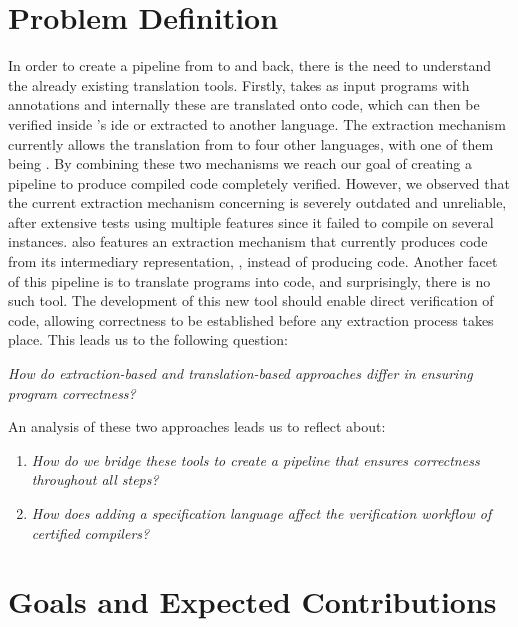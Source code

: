 \section{Problem Definition}
\label{sec:Problem_Definition}

In order to create a pipeline from \ocaml to \cml and back, there is the need to understand the already existing translation tools.
Firstly, \cameleer takes as input \ocaml programs with \gospel annotations and internally these are translated onto \whyml code, which
can then be verified inside \whythree's ide or extracted to another language. The \whythree extraction mechanism currently allows the 
translation from \whyml to four other languages, with one of them being \cml. By combining these two mechanisms we reach our goal
of creating a pipeline to produce compiled code completely verified. However, we observed that the current extraction mechanism 
concerning \cml is severely outdated and unreliable, after extensive tests using multiple \ocaml features since it failed to compile 
on several instances. \cameleer also features an extraction mechanism that currently produces \ocaml code from its intermediary
representation, \whyml, instead of producing \cml code. Another facet of this pipeline is to translate \cml programs into \ocaml
code, and surprisingly, there is no such tool. The development of this new tool should enable direct verification of \cml code, 
allowing correctness to be established before any extraction process takes place. This leads us to the following question: 

\vspace{5mm}
\centerline{\textit{How do extraction-based and translation-based approaches differ in ensuring program correctness?}}

An analysis of these two approaches leads us to reflect about:

\begin{enumerate}
    \item \centerline{\textit{How do we bridge these tools to create a pipeline that ensures correctness throughout all steps?}}
    \item \centerline{\textit{How does adding a specification language affect the verification workflow of certified compilers?}}
\end{enumerate}

\section{Goals and Expected Contributions}
\label{sec:Goals_and_Expected_Contributions}

